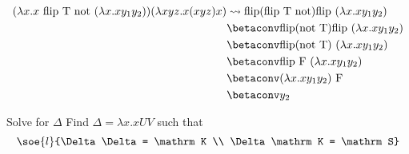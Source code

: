 \documentclass[a4paper, 12pt]{report}
\begin{document}
{        \begin{equation*}
            \begin{split}
                (\lambda x. x \ \mathrm{flip} \ \mathrm T \ \mathrm{not} \ (\lambda x.x y_1 y_2))(\lambda xyz.x(xyz)x) &\leadsto \mathrm{flip}(\mathrm{flip} \ \mathrm T \ \mathrm{not}) \mathrm{flip} \ (\lambda x.xy_1y_2) \\
                                                                                                                       &\betaconv \mathrm{flip}(\mathrm {not} \ \mathrm T) \mathrm{flip} \ (\lambda x.xy_1y_2) \\
                                                                                                                       &\betaconv \mathrm{flip}(\mathrm{not} \ \mathrm T) \ (\lambda x.xy_1y_2) \\
                                                                                                                       &\betaconv \mathrm{flip} \ \mathrm{F} \ (\lambda x.xy_1y_2) \\
                                                                                                                       &\betaconv (\lambda x.xy_1y_2) \ \mathrm F \\
                                                                                                                       &\betaconv  y_2
            \end{split}
        \end{equation*}
    }

    \begin{framedprob}{Solve for $\Delta$}
        Find $\Delta = \lambda x.x UV$ such that $$\soe{l}{\Delta \Delta = \mathrm K \\ \Delta \mathrm K = \mathrm S}$$
    \end{framedprob}
\end{document}
